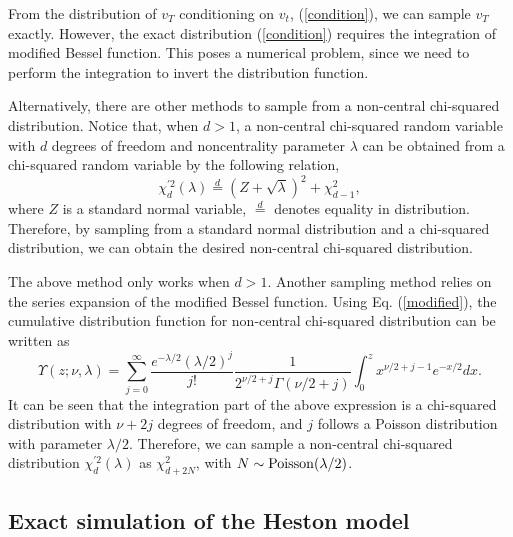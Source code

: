\documentclass[12pt]{article}
\begin{document}
    From the distribution of $v_T$ conditioning on $v_t$, (\ref{condition}), we can sample $v_T$ exactly. However, the exact
    distribution (\ref{condition}) requires the integration of modified Bessel function. This poses a numerical problem, since
    we need to perform the integration to invert the distribution function.

    Alternatively, there are other methods to sample from a non-central chi-squared distribution. Notice that, when $d>1$, a
    non-central chi-squared random variable with $d$ degrees of freedom and noncentrality parameter $\lambda$ can be obtained
    from a chi-squared random variable by the following relation,
    \begin{equation}
      \chi_d^{\prime 2}(\lambda) \stackrel{d}{=} \left(Z+\sqrt{\lambda}\right)^2 + \chi_{d-1}^2,
    \end{equation}
    where $Z$ is a standard normal variable, $\stackrel{d}{=}$ denotes equality in distribution. Therefore, by sampling from
    a standard normal distribution and a chi-squared distribution, we can obtain the desired non-central chi-squared distribution.

    The above method only works when $d>1$. Another sampling method relies on the series expansion of the modified Bessel function.
    Using Eq. (\ref{modified}), the cumulative distribution function for non-central chi-squared distribution can be written as
    \begin{equation}
      \Upsilon\left(z;\nu,\lambda\right) = \sum_{j=0}^{\infty} \frac{e^{-\lambda/2}(\lambda/2)^j}{j!}\frac{1}{2^{\nu/2+j}\Gamma(\nu/2+j)}
                  \int_0^z x^{\nu/2+j-1}e^{-x/2}dx.
    \end{equation}
    It can be seen that the integration part of the above expression is a chi-squared distribution with $\nu+2j$ degrees of freedom,
    and $j$ follows a Poisson distribution with parameter $\lambda/2$. Therefore, we can sample a non-central chi-squared distribution
    $\chi_d^{\prime 2}(\lambda)$ as $\chi_{d+2N}^{ 2}$, with $N\sim {\rm Poisson}(\lambda/2)$.

  \subsection{Exact simulation of the Heston model \cite{BK}}
\end{document}
